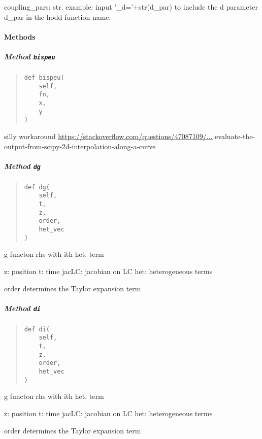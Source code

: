 \documentclass[
  english,
  a4paper,
  oneside]{article}
\begin{document}
coupling\_pars: str. example: input '\_d='+str(d\_par) to include the d
parameter d\_par in the hodd function name.

\hypertarget{methods}{%
\paragraph{Methods}\label{methods}}

\hypertarget{StrongCoupling.StrongCoupling.bispeu}{%
\subparagraph{\texorpdfstring{Method
\texttt{bispeu}}{Method bispeu}}\label{StrongCoupling.StrongCoupling.bispeu}}

\begin{quote}
\begin{verbatim}
def bispeu(
    self,
    fn,
    x,
    y
)
\end{verbatim}
\end{quote}

silly workaround \url{https://stackoverflow.com/questions/47087109/...}
evaluate-the-output-from-scipy-2d-interpolation-along-a-curve

\hypertarget{StrongCoupling.StrongCoupling.dg}{%
\subparagraph{\texorpdfstring{Method
\texttt{dg}}{Method dg}}\label{StrongCoupling.StrongCoupling.dg}}

\begin{quote}
\begin{verbatim}
def dg(
    self,
    t,
    z,
    order,
    het_vec
)
\end{verbatim}
\end{quote}

g functon rhs with ith het. term

z: position t: time jacLC: jacobian on LC het: heterogeneous terms

order determines the Taylor expansion term

\hypertarget{StrongCoupling.StrongCoupling.di}{%
\subparagraph{\texorpdfstring{Method
\texttt{di}}{Method di}}\label{StrongCoupling.StrongCoupling.di}}

\begin{quote}
\begin{verbatim}
def di(
    self,
    t,
    z,
    order,
    het_vec
)
\end{verbatim}
\end{quote}

g functon rhs with ith het. term

z: position t: time jacLC: jacobian on LC het: heterogeneous terms

order determines the Taylor expansion term
\end{document}
